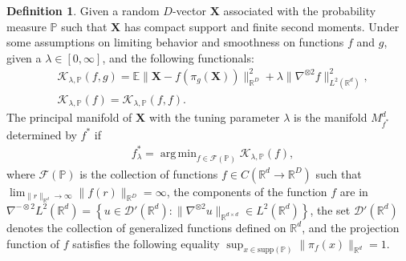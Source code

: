 \documentclass[11pt,reqno]{article}
\DeclareMathOperator*{\argmin}{arg\,min}
\theoremstyle{definition}
\newtheorem{definition}{Definition}
\begin{document}
\begin{definition}
  \label{def:principal_manifolds}
  Given a random $D$-vector $\boldsymbol{X}$ associated with the probability measure $\mathbb{P}$ such that $\boldsymbol{X}$ has compact support and finite second moments. Under some assumptions on limiting behavior and smoothness on functions $f$ and  $g$, given a $\lambda \in [0, \infty]$, and the following functionals:
  \begin{align}\label{eq:5}
&\mathcal{K}_{\lambda, \mathbb{P}}(f, g) = \mathbb{E}\|\boldsymbol{X} - f(\pi_g(\boldsymbol{X}))\|_{\mathbb{R}^{D}}^2 + \lambda\|\nabla^{\otimes 2}f\|_{L^2(\mathbb{R}^{d})}^2, \\
&\mathcal{K}_{\lambda, \mathbb{P}}(f) = \mathcal{K}_{\lambda, \mathbb{P}}(f, f). \nonumber
  \end{align}
  The principal manifold of $\boldsymbol{X}$ with the tuning parameter $\lambda$ is the manifold $M_{f^{*}}^{d}$ determined by $f^{*}$ if
  \begin{equation}\nonumber
    \begin{aligned}
        & f_{\lambda}^{*} = \argmin_{f \in \mathcal{F}(\mathbb{P})}\mathcal{K}_{\lambda, \mathbb{P}}(f),
    \end{aligned}
  \end{equation}
where $\mathcal{F}(\mathbb{P})$ is the collection of functions $f \in C(\mathbb{R}^{d} \to \mathbb{R}^{D})$ such that $\lim_{\|r\|_{\mathbb{R}^{d}} \to \infty}\|f(r)\|_{\mathbb{R}^{D}} = \infty$, the components of the function $f$ are in $\nabla^{-\otimes 2}L^2(\mathbb{R}^{d}) = \left\{u \in \mathcal{D}'(\mathbb{R}^{d}): \|\nabla^{\otimes 2} u\|_{\mathbb{R}^{d \times d}} \in L^2(\mathbb{R}^{d})\right\}$, the set $\mathcal{D}'(\mathbb{R}^d)$ denotes the collection of generalized functions defined on $\mathbb{R}^d$, and the projection function of $f$ satisfies the following equality $\sup_{x \in \text{supp}(\mathbb{P})}\|\pi_f(x)\|_{\mathbb{R}^{d}} = 1$.
\end{definition}
\end{document}
